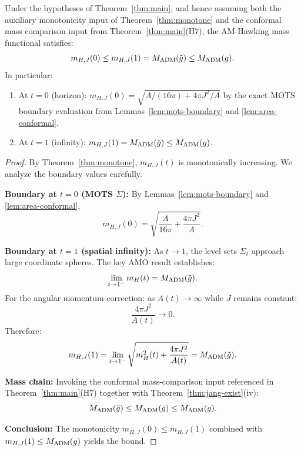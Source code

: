 \begin{theorem}\label{thm:amo-mono}
Under the hypotheses of Theorem~\ref{thm:main}, and hence assuming both the auxiliary monotonicity input of Theorem~\ref{thm:monotone} and the conformal mass comparison input from Theorem~\ref{thm:main}(H7), the AM-Hawking mass functional satisfies:
\[
m_{H,J}(0) \leq m_{H,J}(1)=M_{\mathrm{ADM}}(\tilde{g})\le M_{\mathrm{ADM}}(g).
\]
In particular:
\begin{enumerate}
    \item At $t = 0$ (horizon): $m_{H,J}(0) = \sqrt{A/(16\pi) + 4\pi J^2/A}$ by the exact MOTS boundary evaluation from Lemmas~\ref{lem:mots-boundary} and \ref{lem:area-conformal}.
    \item At $t = 1$ (infinity): $m_{H,J}(1) = M_{\mathrm{ADM}}(\tilde{g}) \leq M_{\mathrm{ADM}}(g)$.
\end{enumerate}
\end{theorem}

\begin{proof}
By Theorem~\ref{thm:monotone}, $m_{H,J}(t)$ is monotonically increasing. We analyze the boundary values carefully.

\textbf{Boundary at $t = 0$ (MOTS $\Sigma$):}
By Lemmas~\ref{lem:mots-boundary} and \ref{lem:area-conformal},
\[
m_{H,J}(0) = \sqrt{\frac{A}{16\pi} + \frac{4\pi J^2}{A}}.
\]

\textbf{Boundary at $t = 1$ (spatial infinity):}
As $t \to 1$, the level sets $\Sigma_t$ approach large coordinate spheres. The key AMO result \cite[Theorem 1.3]{amo2022} establishes:
\[
\lim_{t \to 1^-} m_H(t) = M_{\mathrm{ADM}}(\tilde{g}).
\]
For the angular momentum correction: as $A(t) \to \infty$ while $J$ remains constant:
\[
\frac{4\pi J^2}{A(t)} \to 0.
\]
Therefore:
\[
m_{H,J}(1) = \lim_{t \to 1^-}\sqrt{m_H^2(t) + \frac{4\pi J^2}{A(t)}} = M_{\mathrm{ADM}}(\tilde{g}).
\]

\textbf{Mass chain:}
Invoking the conformal mass-comparison input referenced in Theorem~\ref{thm:main}(H7) together with Theorem~\ref{thm:jang-exist}(iv):
\[
M_{\mathrm{ADM}}(\tilde{g}) \leq M_{\mathrm{ADM}}(\bar{g}) \leq M_{\mathrm{ADM}}(g).
\]

\textbf{Conclusion:}
The monotonicity $m_{H,J}(0) \leq m_{H,J}(1)$ combined with $m_{H,J}(1) \leq M_{\mathrm{ADM}}(g)$ yields the bound.
\end{proof}

